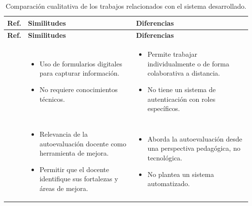 \begin{longtable}{p{} p{} p{}}
  \caption{Comparación cualitativa de los trabajos relacionados con el sistema desarrollado.}\label{table:trabajosRelacionados}\\
\hline
\textbf{Ref.}&
\textbf{Similitudes} &
\textbf{Diferencias} \\
\hline
\endfirsthead

\hline
\textbf{Ref.}&
\textbf{Similitudes} &
\textbf{Diferencias} \\
\hline
\endhead
\hline
\endlastfoot
\cite{leyva2018google} &
    \begin{itemize}[topsep=0pt,itemsep=0pt,parsep=0pt,partopsep=0pt]
        \item Uso de formularios digitales para capturar información.
        \item No requiere conocimientos técnicos.
    \end{itemize} &
    \begin{itemize}[topsep=0pt,itemsep=0pt,parsep=0pt,partopsep=0pt]
        \item Permite trabajar individualmente o de forma colaborativa a distancia.
        \item No tiene un sistema de autenticación con roles específicos.
    \end{itemize} \\
    \midrule

\cite{echeverria2011autoevaluacion} &
    \begin{itemize}[topsep=0pt,itemsep=0pt,parsep=0pt,partopsep=0pt]
        \item Relevancia de la autoevaluación docente como herramienta de mejora.
        \item Permitir que el docente identifique sus fortalezas y áreas de mejora.
    \end{itemize} &
    \begin{itemize}[topsep=0pt,itemsep=0pt,parsep=0pt,partopsep=0pt]
        \item Aborda la autoevaluación desde una perspectiva pedagógica, no tecnológica.
        \item No plantea un sistema automatizado.
    \end{itemize} \\
\midrule
    

\end{longtable}

